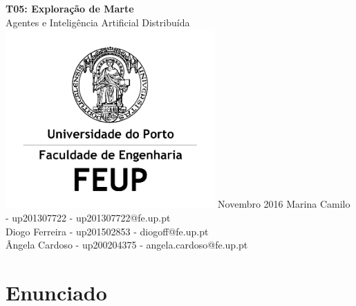\documentclass[12pt]{report}
\begin{document}
\newcommand{\sajas}{\texttt{SAJaS}\xspace}
\newcommand{\jade}{\texttt{JADE}\xspace}
\newcommand{\repast}{\texttt{Repast 3}\xspace}
\newcommand{\massim}{\texttt{MASSim2Dev}\xspace}
\newcommand{\java}{\texttt{JAVA}\xspace}
\newcommand{\acl}{\texttt{ACL}\xspace}
\newcommand{\fipa}{\texttt{FIPA}\xspace}
\newcommand{\spotter}{\emph{spotter}\xspace}
\newcommand{\Spotter}{\emph{Spotter}\xspace}
\newcommand{\spotters}{\emph{spotters}\xspace}
\newcommand{\Producer}{\emph{Producer}\xspace}
\newcommand{\producer}{\emph{producer}\xspace}
\newcommand{\producers}{\emph{producers}\xspace}
\newcommand{\Transporter}{\emph{Transporter}\xspace}
\newcommand{\transporter}{\emph{transporter}\xspace}
\newcommand{\transporters}{\emph{transporters}\xspace}


\begin{titlepage}
	\begin{center}
		\vspace*{1cm}
        \Huge
        \textbf{T05: Exploração de Marte}
        \vspace{0.5cm} \ \\
        \LARGE
        Agentes e Inteligência Artificial Distribuída
        \vfill
		\includegraphics[width=0.6\textwidth]{FEUP_Logo}
		\break
        \small
        Novembro 2016
        \vfill
		\vspace{1.5cm}
        \normalsize{
		Marina Camilo - up201307722 - up201307722@fe.up.pt \\
		Diogo Ferreira - up201502853 - diogoff@fe.up.pt \\
		Ângela Cardoso - up200204375 - angela.cardoso@fe.up.pt
        }
	\end{center}
\end{titlepage}

\tableofcontents

\chapter{Enunciado}
\end{document}
